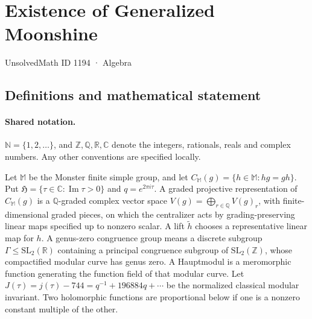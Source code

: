 \documentclass[11pt]{article}
\begin{document}
\setcounter{section}{1193}
\section{Existence of Generalized Moonshine}\label{1194}
{\small\sffamily UnsolvedMath ID 1194 · Algebra}
\subsection{Definitions and mathematical statement}

\paragraph{Shared notation.}$\mathbb N=\{1,2,\ldots\}$, and $\mathbb Z,\mathbb Q,\mathbb R,\mathbb C$ denote the integers, rationals, reals and complex numbers. Any other conventions are specified locally.


Let \(\mathbb M\) be the Monster finite simple group, and let
\(C_{\mathbb M}(g)=\{h\in\mathbb M:hg=gh\}\).
Put \(\mathfrak H=\{\tau\in\mathbb C:\operatorname{Im}\tau>0\}\) and
\(q=e^{2\pi i\tau}\).
A graded projective representation of \(C_{\mathbb M}(g)\) is a
\(\mathbb Q\)-graded complex vector space
\(V(g)=\bigoplus_{r\in\mathbb Q}V(g)_r\), with finite-dimensional graded
pieces, on which the centralizer acts by grading-preserving linear
maps specified up to nonzero scalar.
A lift \(\widetilde h\) chooses a representative linear map for \(h\).
A genus-zero congruence group means a discrete subgroup
\(\Gamma\le\mathrm{SL}_2(\mathbb R)\) containing a principal congruence
subgroup of \(\mathrm{SL}_2(\mathbb Z)\), whose compactified modular
curve has genus zero.  A Hauptmodul is a meromorphic function
generating the function field of that modular curve.
Let \(J(\tau)=j(\tau)-744=q^{-1}+196884q+\cdots\) be the normalized
classical modular invariant.
Two holomorphic functions are proportional below if one is a
nonzero constant multiple of the other.
\end{document}
